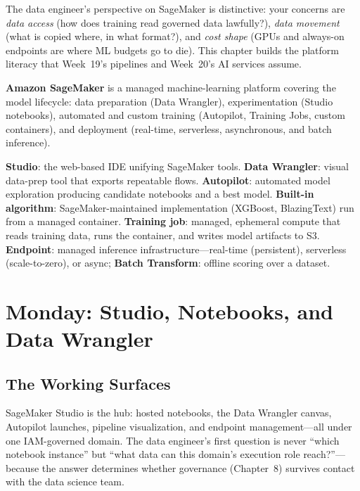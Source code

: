 The data engineer's perspective on SageMaker is distinctive: your concerns are \emph{data access} (how does training read governed data lawfully?), \emph{data movement} (what is copied where, in what format?), and \emph{cost shape} (GPUs and always-on endpoints are where ML budgets go to die). This chapter builds the platform literacy that Week~19's pipelines and Week~20's AI services assume.

\begin{definitionbox}
\textbf{Amazon SageMaker} is a managed machine-learning platform covering the model lifecycle: data preparation (Data Wrangler), experimentation (Studio notebooks), automated and custom training (Autopilot, Training Jobs, custom containers), and deployment (real-time, serverless, asynchronous, and batch inference).
\end{definitionbox}

\begin{keyterms}
\textbf{Studio}: the web-based IDE unifying SageMaker tools. \textbf{Data Wrangler}: visual data-prep tool that exports repeatable flows. \textbf{Autopilot}: automated model exploration producing candidate notebooks and a best model. \textbf{Built-in algorithm}: SageMaker-maintained implementation (XGBoost, BlazingText) run from a managed container. \textbf{Training job}: managed, ephemeral compute that reads training data, runs the container, and writes model artifacts to S3. \textbf{Endpoint}: managed inference infrastructure---real-time (persistent), serverless (scale-to-zero), or async; \textbf{Batch Transform}: offline scoring over a dataset.
\end{keyterms}

\section{Monday: Studio, Notebooks, and Data Wrangler}
\subsection{The Working Surfaces}
SageMaker Studio is the hub: hosted notebooks, the Data Wrangler canvas, Autopilot launches, pipeline visualization, and endpoint management---all under one IAM-governed domain. The data engineer's first question is never ``which notebook instance'' but ``what data can this domain's execution role reach?''---because the answer determines whether governance (Chapter~8) survives contact with the data science team.

